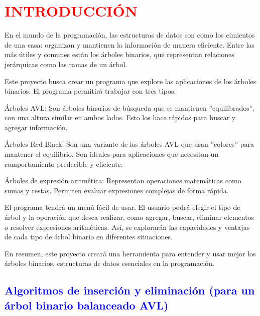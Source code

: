 \documentclass[12pt]{article}
\begin{document}
\section*{\textcolor{red}{\textbf{INTRODUCCIÓN}}}
En el mundo de la programación, las estructuras de datos son como los cimientos de una casa: organizan y mantienen la información de manera eficiente. Entre las más útiles y comunes están los árboles binarios, que representan relaciones jerárquicas como las ramas de un árbol.
\par\vspace{0.4cm}
Este proyecto busca crear un programa que explore las aplicaciones de los árboles binarios. El programa permitirá trabajar con tres tipos:
\par\vspace{0.4cm}
Árboles AVL: Son árboles binarios de búsqueda que se mantienen ''equilibrados'', con una altura similar en ambos lados. Esto los hace rápidos para buscar y agregar información.
\par\vspace{0.4cm}
Árboles Red-Black: Son una variante de los árboles AVL que usan ''colores'' para mantener el equilibrio. Son ideales para aplicaciones que necesitan un comportamiento predecible y eficiente.
\par\vspace{0.4cm}
Árboles de expresión aritmética: Representan operaciones matemáticas como sumas y restas. Permiten evaluar expresiones complejas de forma rápida.
\par\vspace{0.4cm}
El programa tendrá un menú fácil de usar. El usuario podrá elegir el tipo de árbol y la operación que desea realizar, como agregar, buscar, eliminar elementos o resolver expresiones aritméticas. Así, se explorarán las capacidades y ventajas de cada tipo de árbol binario en diferentes situaciones.
\par\vspace{0.4cm}
En resumen, este proyecto creará una herramienta para entender y usar mejor los árboles binarios, estructuras de datos esenciales en la programación.
\par\vspace{0.4cm}

\subsection*{\textcolor{blue}{Algoritmos de inserción y eliminación (para un árbol binario balanceado AVL)}}
\end{document}
